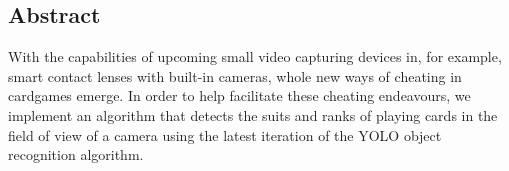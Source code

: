 \documentclass[a0,landscape]{a0poster}
\begin{document}
\vspace{1cm} %


\begin{multicols}{3} %


\color{Navy} %

\centering\section*{Abstract}
\raggedright	
\Large
With the capabilities of upcoming small video capturing devices in, for example, smart contact lenses with built-in cameras, whole new ways of cheating in cardgames emerge. In order to help facilitate these cheating endeavours, we implement an algorithm that detects the suits and ranks of playing cards in the field of view of a camera using the latest iteration of the YOLO object recognition algorithm.


\color{DarkSlateGray} %


\large




\end{multicols}
\end{document}
